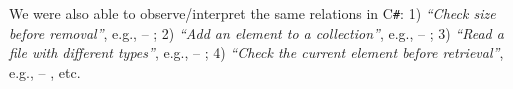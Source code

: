 We were also able to observe/interpret the same relations in
C\texttt{\#}: 1) {\em ``Check size before removal''}, e.g.,
   -- ; 2) {\em ``Add
    an element to a collection''}, e.g.,  --
  ; 3) {\em ``Read a file with different types''},
  e.g.,  -- ; 4) {\em
    ``Check the current element before retrieval''}, e.g.,
   -- , etc.




